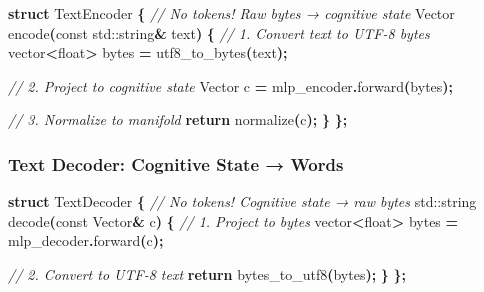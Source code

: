 \documentclass[
  11pt,
  a4paper,
]{article}
\newenvironment{Shaded}{\begin{snugshade}}{\end{snugshade}}
\newcommand{\AttributeTok}[1]{\textcolor[rgb]{0.13,0.29,0.53}{#1}}
\newcommand{\BuiltInTok}[1]{#1}
\newcommand{\CommentTok}[1]{\textcolor[rgb]{0.56,0.35,0.01}{\textit{#1}}}
\newcommand{\ControlFlowTok}[1]{\textcolor[rgb]{0.13,0.29,0.53}{\textbf{#1}}}
\newcommand{\DataTypeTok}[1]{\textcolor[rgb]{0.13,0.29,0.53}{#1}}
\newcommand{\KeywordTok}[1]{\textcolor[rgb]{0.13,0.29,0.53}{\textbf{#1}}}
\newcommand{\NormalTok}[1]{#1}
\newcommand{\OperatorTok}[1]{\textcolor[rgb]{0.81,0.36,0.00}{\textbf{#1}}}
\begin{document}
\begin{Shaded}
\begin{Highlighting}[]
\KeywordTok{struct}\NormalTok{ TextEncoder }\OperatorTok{\{}
    \CommentTok{// No tokens! Raw bytes → cognitive state}
\NormalTok{    Vector encode}\OperatorTok{(}\AttributeTok{const} \BuiltInTok{std::}\NormalTok{string}\OperatorTok{\&}\NormalTok{ text}\OperatorTok{)} \OperatorTok{\{}
        \CommentTok{// 1. Convert text to UTF{-}8 bytes}
\NormalTok{        vector}\OperatorTok{\textless{}}\DataTypeTok{float}\OperatorTok{\textgreater{}}\NormalTok{ bytes }\OperatorTok{=}\NormalTok{ utf8\_to\_bytes}\OperatorTok{(}\NormalTok{text}\OperatorTok{);}
        
        \CommentTok{// 2. Project to cognitive state}
\NormalTok{        Vector c }\OperatorTok{=}\NormalTok{ mlp\_encoder}\OperatorTok{.}\NormalTok{forward}\OperatorTok{(}\NormalTok{bytes}\OperatorTok{);}
        
        \CommentTok{// 3. Normalize to manifold}
        \ControlFlowTok{return}\NormalTok{ normalize}\OperatorTok{(}\NormalTok{c}\OperatorTok{);}
    \OperatorTok{\}}
\OperatorTok{\};}
\end{Highlighting}
\end{Shaded}

\subsubsection{Text Decoder: Cognitive State →
Words}\label{text-decoder-cognitive-state-words}

\begin{Shaded}
\begin{Highlighting}[]
\KeywordTok{struct}\NormalTok{ TextDecoder }\OperatorTok{\{}
    \CommentTok{// No tokens! Cognitive state → raw bytes}
    \BuiltInTok{std::}\NormalTok{string decode}\OperatorTok{(}\AttributeTok{const}\NormalTok{ Vector}\OperatorTok{\&}\NormalTok{ c}\OperatorTok{)} \OperatorTok{\{}
        \CommentTok{// 1. Project to bytes}
\NormalTok{        vector}\OperatorTok{\textless{}}\DataTypeTok{float}\OperatorTok{\textgreater{}}\NormalTok{ bytes }\OperatorTok{=}\NormalTok{ mlp\_decoder}\OperatorTok{.}\NormalTok{forward}\OperatorTok{(}\NormalTok{c}\OperatorTok{);}
        
        \CommentTok{// 2. Convert to UTF{-}8 text}
        \ControlFlowTok{return}\NormalTok{ bytes\_to\_utf8}\OperatorTok{(}\NormalTok{bytes}\OperatorTok{);}
    \OperatorTok{\}}
\OperatorTok{\};}
\end{Highlighting}
\end{Shaded}
\end{document}
